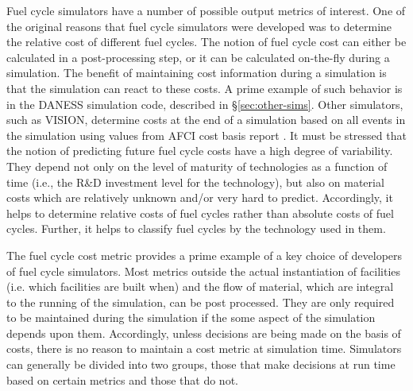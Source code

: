 Fuel cycle simulators have a number of possible output metrics of interest. One
of the original reasons that fuel cycle simulators were developed was to
determine the relative cost of different fuel cycles. The notion of fuel cycle
cost can either be calculated in a post-processing step, or it can be calculated
on-the-fly during a simulation. The benefit of maintaining cost information
during a simulation is that the simulation can react to these costs. A prime
example of such behavior is in the DANESS simulation code, described
in \S\ref{sec:other-sims}. Other simulators, such as VISION, determine costs at
the end of a simulation based on all events in the simulation using values from
AFCI cost basis report \cite{yacout_vision_2006,shropshire_advanced_2007}. It
must be stressed that the notion of predicting future fuel cycle costs have a
high degree of variability. They depend not only on the level of maturity of
technologies as a function of time (i.e., the R\&D investment level for the
technology), but also on material costs which are relatively unknown and/or very
hard to predict. Accordingly, it helps to determine relative costs of fuel
cycles rather than absolute costs of fuel cycles. Further, it helps to classify
fuel cycles by the technology used in them. 

The fuel cycle cost metric provides a prime example of a key choice of
developers of fuel cycle simulators. Most metrics outside the actual
instantiation of facilities (i.e. which facilities are built when) and the flow
of material, which are integral to the running of the simulation, can be post
processed. They are only required to be maintained during the simulation if the
some aspect of the simulation depends upon them. Accordingly, unless decisions
are being made on the basis of costs, there is no reason to maintain a cost
metric at simulation time. Simulators can generally be divided into two groups,
those that make decisions at run time based on certain metrics and those that do
not.

